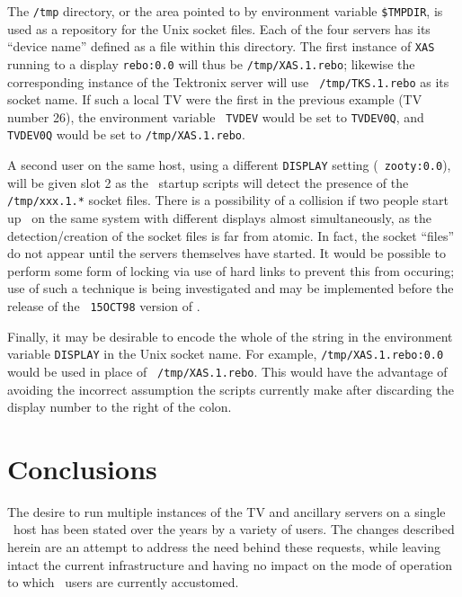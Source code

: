 The {\tt /tmp} directory, or the area pointed to by environment variable
{\tt\$TMPDIR}, is used as a repository for the Unix socket files.  Each
of the four servers has its ``device name'' defined as a file within
this directory.  The first instance of {\tt XAS} running to a display
{\tt rebo:0.0} will thus be {\tt /tmp/XAS.1.rebo}; likewise the
corresponding instance of the Tektronix server will use {\tt
/tmp/TKS.1.rebo} as its socket name.  If such a local TV were the first
in the previous example (TV number 26), the environment variable {\tt
TVDEV} would be set to {\tt TVDEV0Q}, and {\tt TVDEV0Q} would be set to
{\tt /tmp/XAS.1.rebo}.
\vfill\eject %

A second user on the same host, using a different {\tt DISPLAY} setting
(\eg\ {\tt zooty:0.0}), will be given slot 2 as the \AIPS\ startup
scripts will detect the presence of the {\tt /tmp/xxx.1.*} socket files.
There is a possibility of a collision if two people start up \ttaips\ on
the same system with different displays almost simultaneously, as the
detection/creation of the socket files is far from atomic.  In fact, the
socket ``files'' do not appear until the servers themselves have
started.  It would be possible to perform some form of locking via use
of hard links to prevent this from occuring; use of such a technique is
being investigated and may be implemented before the release of the {\tt
15OCT98} version of \AIPS.

Finally, it may be desirable to encode the whole of the string in the
environment variable {\tt DISPLAY} in the Unix socket name.  For
example, {\tt /tmp/XAS.1.rebo:0.0} would be used in place of {\tt
/tmp/XAS.1.rebo}.  This would have the advantage of avoiding the
incorrect assumption the scripts currently make after discarding the
display number to the right of the colon.

\section{Conclusions}

The desire to run multiple instances of the TV and ancillary servers on
a single \AIPS\ host has been stated over the years by a variety of
users.  The changes described herein are an attempt to address the need
behind these requests, while leaving intact the current infrastructure
and having no impact on the mode of operation to which \AIPS\ users are
currently accustomed.


